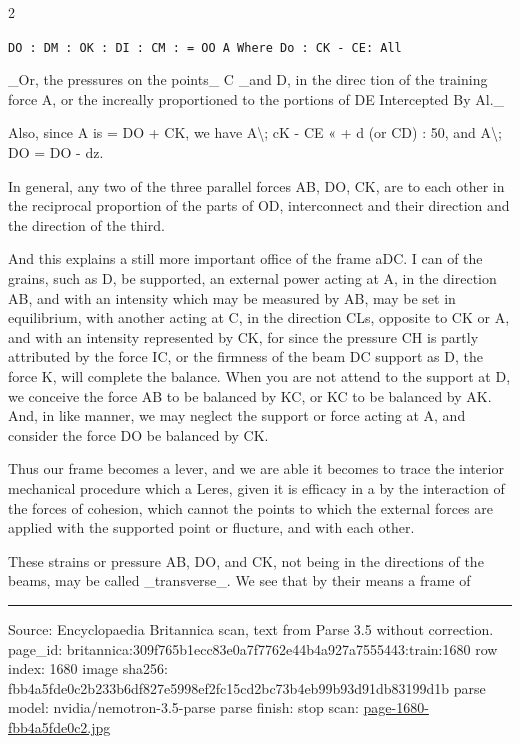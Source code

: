 \documentclass[10pt]{article}
\begin{document}
\begin{multicols}{2}
\begin{center}\small\texttt{DO : DM : OK : DI : CM : = OO A Where Do : CK - CE: All}\end{center}
\_Or, the pressures on the points\_ C \_and D, in the direc tion of the training force A, or the increally proportioned to the portions of DE Intercepted By Al.\_

Also, since A is = DO + CK, we have A\textbackslash{}; cK - CE « + d (or CD) : 50, and A\textbackslash{}; DO = DO - dz.

In general, any two of the three parallel forces AB, DO, CK, are to each other in the reciprocal proportion of the parts of OD, interconnect and their direction and the direction of the third.

And this explains a still more important office of the frame aDC. I can of the grains, such as D, be supported, an external power acting at A, in the direction AB, and with an intensity which may be measured by AB, may be set in equilibrium, with another acting at C, in the direction CLs, opposite to CK or A, and with an intensity represented by CK, for since the pressure CH is partly attributed by the force IC, or the firmness of the beam DC support as D, the force K, will complete the balance. When you are not attend to the support at D, we conceive the force AB to be balanced by KC, or KC to be balanced by AK. And, in like manner, we may neglect the support or force acting at A, and consider the force DO be balanced by CK.

Thus our frame becomes a lever, and we are able it becomes to trace the interior mechanical procedure which a Leres, given it is efficacy in a by the interaction of the forces of cohesion, which cannot the points to which the external forces are applied with the supported point or flucture, and with each other.

These strains or pressure AB, DO, and CK, not being in the directions of the beams, may be called \_transverse\_. We see that by their means a frame of

\end{multicols}
\vfill\par\noindent\rule{\linewidth}{0.4pt}\par
{\scriptsize\color{gray}\noindent Source: Encyclopaedia Britannica scan, text from Parse 3.5 without correction. page\_id: britannica:309f765b1ecc83e0a7f7762e44b4a927a7555443:train:1680 \quad row index: 1680 \quad image sha256: fbb4a5fde0c2b233b6df827e5998ef2fc15cd2bc73b4eb99b93d91db83199d1b \quad parse model: nvidia/nemotron-3.5-parse \quad parse finish: stop \quad scan: \href{../scans/page-1680-fbb4a5fde0c2.jpg}{page-1680-fbb4a5fde0c2.jpg}\par}
\end{document}
